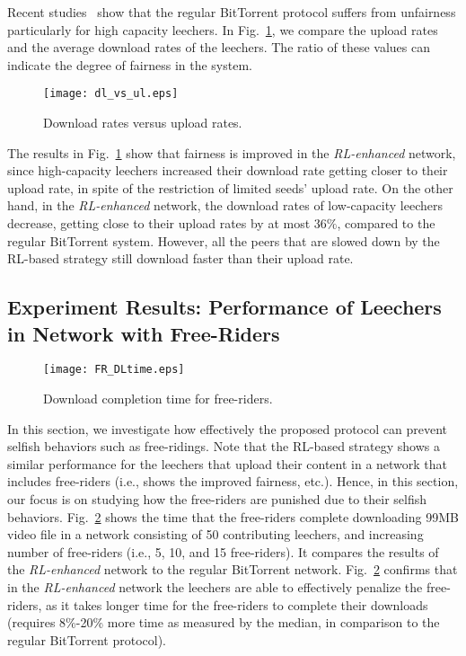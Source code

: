 Recent studies~\cite{piatek07,Buddies,bharambe06,guo05} show that 
the regular BitTorrent protocol suffers from unfairness particularly for high 
capacity leechers.
In Fig.~\ref{fig:dl_vs_ul}, we compare the upload rates and the average 
download rates of the leechers. The ratio of these values can indicate the 
degree of fairness in the system.
\begin{figure}[t]
\centering
\texttt{[image: dl\_vs\_ul.eps]}
\caption{Download rates versus upload rates.} 
\label{fig:dl_vs_ul}
\end{figure}
The results in Fig.~\ref{fig:dl_vs_ul} show that fairness is improved in 
the \emph{RL-enhanced} network, since high-capacity leechers increased their 
download rate getting closer to their upload rate, in spite of the restriction 
of limited seeds' upload rate. On the other hand, in the \emph{RL-enhanced} network, 
the download rates of low-capacity leechers decrease, getting close to their 
upload rates by at most $36\%$, compared to the regular BitTorrent system.
However, all the peers that are slowed down by the RL-based 
strategy still  download faster than their upload rate. \\


\subsection{Experiment Results: Performance of Leechers in Network with
Free-Riders}

\begin{figure}[t]
\centering
\texttt{[image: FR\_DLtime.eps]}
\caption{Download completion time for free-riders.} 
\label{fig:FR_DLtime}
\end{figure}

In this section, we investigate how effectively the proposed protocol can 
prevent selfish behaviors such as free-ridings. Note that the RL-based strategy shows a similar performance for the leechers that upload 
their content in a network that includes free-riders (i.e., shows the 
improved fairness, etc.). Hence, in this section, our focus is on studying how 
the free-riders are punished due to their selfish behaviors. 
Fig.~\ref{fig:FR_DLtime} shows the time that the free-riders complete 
downloading 99MB video file in a network consisting of 50 contributing 
leechers, and increasing number of free-riders (i.e., 5, 10, and 15 
free-riders). It compares the results of the \emph{RL-enhanced} network to the 
regular BitTorrent network. Fig.~\ref{fig:FR_DLtime} confirms that in the 
\emph{RL-enhanced} network the leechers are able to effectively penalize the 
free-riders, as it takes longer time for the free-riders to complete their 
downloads (requires 8\%-20\% more time as measured by the median, in 
comparison to the regular BitTorrent protocol).

